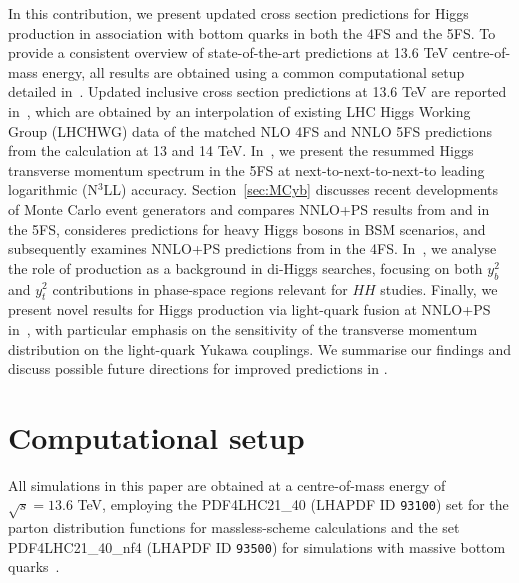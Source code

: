 \documentclass[11pt,a4paper]{article}
\begin{document}
In this contribution, we present updated cross section predictions for Higgs production in association with bottom quarks in both the 4FS and the 5FS. 
To provide a consistent overview of state-of-the-art \bbH{} predictions at 13.6 TeV centre-of-mass energy, all results are obtained using 
a common computational setup detailed in~. Updated inclusive cross section predictions at 13.6 TeV are 
reported in~, which are obtained by an interpolation of existing LHC Higgs Working Group (LHCHWG) data \cite{LHCHiggsCrossSectionWorkingGroup:2016ypw} of the 
matched NLO 4FS and NNLO 5FS predictions from the \nlonnllpart{} calculation at 13 and 14 TeV. 
In~, we present the resummed Higgs transverse momentum spectrum in the 5FS 
at next-to-next-to-next-to leading logarithmic  (N$^3$LL) accuracy.
Section~\ref{sec:MCyb} discusses recent developments of Monte Carlo event generators and compares NNLO+PS results
from \minnlo{} and \GENEVA{} in the 5FS, consideres \minnlo{} predictions for heavy Higgs bosons in BSM scenarios, 
and subsequently examines NNLO+PS predictions from \minnlo{} in the 4FS.
In~, we analyse the role of \bbH{} production as a background in di-Higgs searches, 
focusing on both $y_b^2$ and $y_t^2$ contributions in phase-space regions relevant for $HH$ studies.
Finally, we present novel results for Higgs production via light-quark fusion at NNLO+PS in~, 
with particular emphasis on the sensitivity of the transverse momentum distribution on the light-quark Yukawa couplings.
We summarise our findings and discuss possible future directions for improved \bbH{} predictions in .

\section{Computational setup}\label{sec:setup}
All simulations in this paper are obtained at a centre-of-mass energy of $\sqrt{s}=13.6$ TeV, employing the PDF4LHC21\_40 (LHAPDF ID \texttt{93100}) set for the parton distribution functions for massless-scheme calculations and the set PDF4LHC21\_40\_nf4 (LHAPDF ID \texttt{93500}) for simulations with massive bottom quarks~\cite{PDF4LHCWorkingGroup:2022cjn}. 
\end{document}
